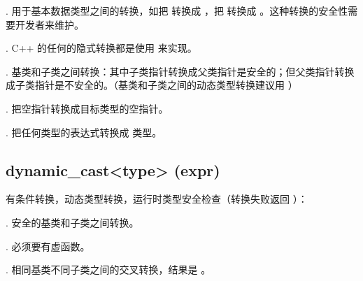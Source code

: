 \documentclass[letterpaper,10pt,english]{sphinxmanual}
\begin{document}
. 用于基本数据类型之间的转换，如把  转换成  ，把  转换成  。这种转换的安全性需要开发者来维护。

. C++ 的任何的隐式转换都是使用  来实现。

. 基类和子类之间转换：其中子类指针转换成父类指针是安全的；但父类指针转换成子类指针是不安全的。（基类和子类之间的动态类型转换建议用  ）

. 把空指针转换成目标类型的空指针。

. 把任何类型的表达式转换成  类型。


\subsection{dynamic\_cast\textless{}type\textgreater{} (expr)}
\label{\detokenize{cpp/10_cast:dynamic-cast-type-expr}}
有条件转换，动态类型转换，运行时类型安全检查（转换失败返回  ）：

. 安全的基类和子类之间转换。

. 必须要有虚函数。

. 相同基类不同子类之间的交叉转换，结果是  。
\end{document}
